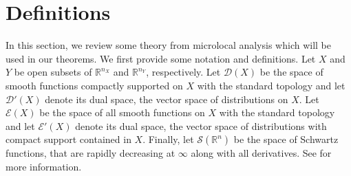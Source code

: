 \documentclass[a4paper,12pt]{amsart}
\numberwithin{equation}{section}
\theoremstyle{plain}
\numberwithin{theorem}{section}
\theoremstyle{definition}
\theoremstyle{remark}
\theoremstyle{remark}
\theoremstyle{remark}
\newcommand{\Dc}{\mathcal{D}}
\newcommand{\Ec}{\mathcal{E}}
\newcommand{\Sc}{\mathcal{S}}
\newcommand{\rn}{{{\mathbb R}^n}}
\newcommand{\intt}{{\operatorname{int}}}
\begin{document}
\section{Definitions}\label{sect:defns} 

In this section, we review some theory from microlocal analysis which will be used in our theorems. We first provide some
notation and definitions.  Let $X$ and $Y$ be open subsets of
{$\mathbb{R}^{n_X}$ and $\mathbb{R}^{n_Y}$, respectively.}  Let $\Dc(X)$ be the space of smooth functions compactly
supported on $X$ with the standard topology and let $\mathcal{D}'(X)$
denote its dual space, the vector space of distributions on $X$.  Let
$\Ec(X)$ be the space of all smooth functions on $X$ with the standard
topology and let $\mathcal{E}'(X)$ denote its dual space, the vector
space of distributions with compact support contained in $X$. Finally,
let $\Sc(\rn)$ be the space of Schwartz functions, that are rapidly
decreasing at $\infty$ along with all derivatives. See \cite{Rudin:FA}
for more information. 

\end{document}
